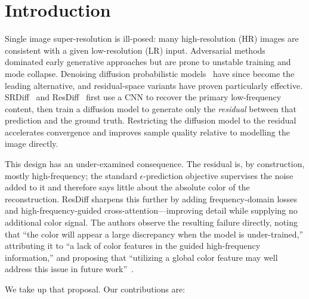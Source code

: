 \documentclass[11pt]{article}
\begin{document}
\section{Introduction}

Single image super-resolution is ill-posed: many high-resolution (HR) images are
consistent with a given low-resolution (LR) input. Adversarial
methods~\cite{wang2018esrgan} dominated early generative approaches but are prone
to unstable training and mode collapse. Denoising diffusion probabilistic
models~\cite{ho2020denoising} have since become the leading alternative, and
residual-space variants have proven particularly effective. SRDiff~\cite{li2022srdiff} and
ResDiff~\cite{shang2024resdiff} first use a CNN to recover the primary
low-frequency content, then train a diffusion model to generate only the
\emph{residual} between that prediction and the ground truth. Restricting the
diffusion model to the residual accelerates convergence and improves sample
quality relative to modelling the image directly.

This design has an under-examined consequence. The residual is, by construction,
mostly high-frequency; the standard $\epsilon$-prediction objective supervises
the noise added to it and therefore says little about the absolute color of the
reconstruction. ResDiff sharpens this further by adding frequency-domain losses
and high-frequency-guided cross-attention---improving detail while supplying no
additional color signal. The authors observe the resulting failure directly,
noting that ``the color will appear a large discrepancy when the model is
under-trained,'' attributing it to ``a lack of color features in the guided
high-frequency information,'' and proposing that ``utilizing a global color
feature may well address this issue in future work''~\cite{shang2024resdiff}.

We take up that proposal. Our contributions are:
\end{document}
